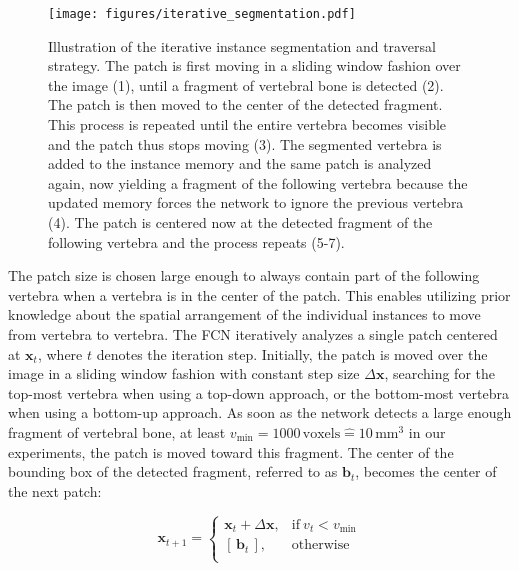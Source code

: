 \documentclass[authoryear,5p,final,times]{elsarticle}
\renewcommand{\vec}[1]{\bm{#1}}
\begin{document}
    \begin{figure*}[t]
        \centering
        \texttt{[image: figures/iterative\_segmentation.pdf]}
        \caption{Illustration of the iterative instance segmentation and traversal strategy. The patch is first moving in a sliding window fashion over the image (1), until a fragment of vertebral bone is detected (2). The patch is then moved to the center of the detected fragment. This process is repeated until the entire vertebra becomes visible and the patch thus stops moving (3). The segmented vertebra is added to the instance memory and the same patch is analyzed again, now yielding a fragment of the following vertebra because the updated memory forces the network to ignore the previous vertebra (4). The patch is centered now at the detected fragment of the following vertebra and the process repeats (5-7).}
        \label{fig:itseg}
    \end{figure*}
    
    The patch size is chosen large enough to always contain part of the following vertebra when a vertebra is in the center of the patch. This enables utilizing prior knowledge about the spatial arrangement of the individual instances to move from vertebra to vertebra. The FCN iteratively analyzes a single patch centered at $\vec{x}_t$, where $t$ denotes the iteration step. Initially, the patch is moved over the image in a sliding window fashion with constant step size $\Delta \vec{x}$, searching for the top-most vertebra when using a top-down approach, or the bottom-most vertebra when using a bottom-up approach. As soon as the network detects a large enough fragment of vertebral bone, at least $v_\text{min} = 1000\,\text{voxels} \mathrel{\hat{=}} 10\,\text{mm}^3$ in our experiments, the patch is moved toward this fragment. The center of the bounding box of the detected fragment, referred to as $\vec{b}_t$, becomes the center of the next patch:
    
    \begin{equation*}
        \vec{x}_{t+1} =
        \begin{cases}
          \vec{x}_t + \Delta \vec{x}, & \text{if}\ v_t < v_{\text{min}}\\
          [\, \vec{b}_t \,], & \text{otherwise}\\
        \end{cases}
    \end{equation*}
    
\end{document}
